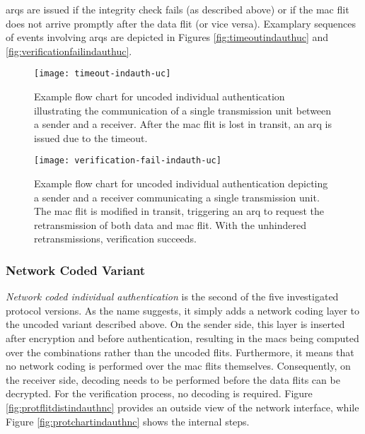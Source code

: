\Glspl{arq} are issued if the integrity check fails (as described above) or if the \gls{mac} flit does not arrive promptly after the data flit (or
vice versa). Examplary sequences of events involving \glspl{arq} are depicted in Figures \vref{fig:timeoutindauthuc} and
\vref{fig:verificationfailindauthuc}.

\begin{figure}
    \centering
    \texttt{[image: timeout-indauth-uc]}
    \caption[Example flow chart for uncoded ind. auth. with timeouts]{Example flow chart for uncoded individual authentication illustrating the communication
    of a single transmission unit between a sender and a receiver. After the \gls{mac} flit is lost in transit, an \gls{arq} is issued due to the
    timeout.}
    \label{fig:timeoutindauthuc}
\end{figure}

\begin{figure}
    \centering
    \texttt{[image: verification-fail-indauth-uc]}
    \caption[Example flow chart for uncoded ind. auth. with integrity breach]{Example flow chart for uncoded individual authentication depicting a
    sender and a receiver communicating a single transmission unit. The \gls{mac} flit is modified in transit, triggering an \gls{arq} to request the
    retransmission of both data and \gls{mac} flit. With the unhindered retransmissions, verification succeeds.}
    \label{fig:verificationfailindauthuc}
\end{figure}

\subsubsection{Network Coded Variant}
\textit{Network coded individual authentication} is the second of the five investigated protocol versions. As the name suggests, it simply adds a
network coding layer to the uncoded variant described above. On the sender side, this layer is inserted after encryption and before authentication,
resulting in the \glspl{mac} being computed over the combinations rather than the uncoded flits. Furthermore, it means that no network coding is
performed over the \gls{mac} flits themselves. Consequently, on the receiver side, decoding needs to be performed before the data flits can be
decrypted. For the verification process, no decoding is required. Figure \vref{fig:protflitdistindauthnc} provides an outside view of the network
interface, while Figure \vref{fig:protchartindauthnc} shows the internal steps.

